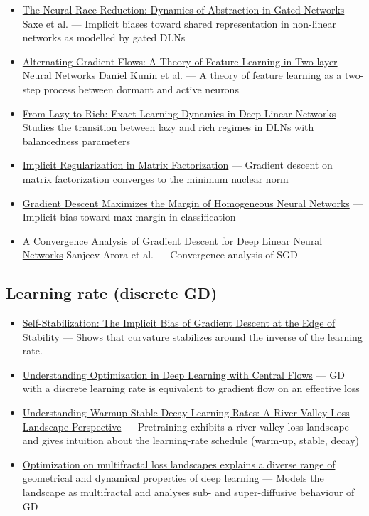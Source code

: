 \documentclass[11pt]{article}
\begin{document}
\begin{itemize}
  \item \href{https://arxiv.org/abs/2207.10430}{The Neural Race Reduction: Dynamics of Abstraction in Gated Networks} Saxe et al. --- Implicit biases toward shared representation in non-linear networks as modelled by gated DLNs
  \item \href{https://arxiv.org/abs/2506.06489}{Alternating Gradient Flows: A Theory of Feature Learning in Two-layer Neural Networks} Daniel Kunin et al. --- A theory of feature learning as a two-step process between dormant and active neurons
  \item \href{https://arxiv.org/abs/2409.14623}{From Lazy to Rich: Exact Learning Dynamics in Deep Linear Networks} --- Studies the transition between lazy and rich regimes in DLNs with balancedness parameters
  \item \href{https://arxiv.org/abs/1705.09280}{Implicit Regularization in Matrix Factorization} --- Gradient descent on matrix factorization converges to the minimum nuclear norm
  \item \href{https://arxiv.org/abs/1906.05890}{Gradient Descent Maximizes the Margin of Homogeneous Neural Networks} --- Implicit bias toward max-margin in classification
  \item \href{https://arxiv.org/abs/1810.02281}{A Convergence Analysis of Gradient Descent for Deep Linear Neural Networks} Sanjeev Arora et al. --- Convergence analysis of SGD
\end{itemize}

\subsection*{Learning rate (discrete GD)}
\begin{itemize}
  \item \href{https://arxiv.org/abs/2209.15594}{Self-Stabilization: The Implicit Bias of Gradient Descent at the Edge of Stability} --- Shows that curvature stabilizes around the inverse of the learning rate.
  \item \href{https://arxiv.org/abs/2410.24206}{Understanding Optimization in Deep Learning with Central Flows} --- GD with a discrete learning rate is equivalent to gradient flow on an effective loss
  \item \href{https://arxiv.org/abs/2410.05192}{Understanding Warmup-Stable-Decay Learning Rates: A River Valley Loss Landscape Perspective} --- Pretraining exhibits a river valley loss landscape and gives intuition about the learning-rate schedule (warm-up, stable, decay)
  \item \href{https://www.nature.com/articles/s41467-025-58532-9}{Optimization on multifractal loss landscapes explains a diverse range of geometrical and dynamical properties of deep learning} --- Models the landscape as multifractal and analyses sub- and super-diffusive behaviour of GD
\end{itemize}
\end{document}
